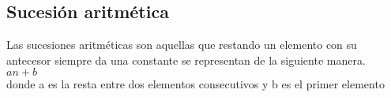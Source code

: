 \subsection{Sucesión aritmética}
Las sucesiones aritméticas son aquellas que restando un elemento con su antecesor siempre da una constante se representan de la siguiente manera.
\\$ an+b$
\\donde a es la resta entre dos elementos consecutivos y b es el primer elemento
